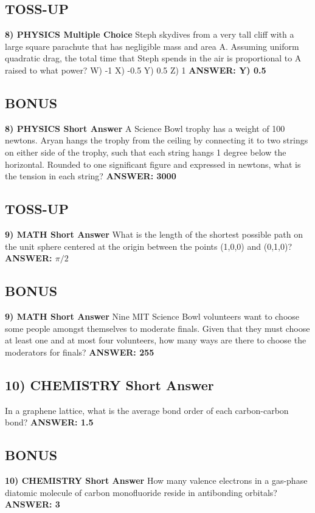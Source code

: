 \documentclass{article}
\begin{document}
\newpage

\subsection*{TOSS-UP}
\textbf{8) PHYSICS Multiple Choice} Steph skydives from a very tall cliff with a large square parachute that has negligible mass and area A. Assuming uniform quadratic drag, the total time that Steph spends in the air is proportional to A raised to what power?
W) -1
X) -0.5
Y) 0.5
Z) 1
\textbf{ANSWER: Y) 0.5}

\subsection*{BONUS}
\textbf{8) PHYSICS Short Answer} A Science Bowl trophy has a weight of 100 newtons. Aryan hangs the trophy from the ceiling by connecting it to two strings on either side of the trophy, such that each string hangs 1 degree below the horizontal. Rounded to one significant figure and expressed in newtons, what is the tension in each string?
\textbf{ANSWER: 3000}

\subsection*{TOSS-UP}
\textbf{9) MATH Short Answer} What is the length of the shortest possible path on the unit sphere centered at the origin between the points (1,0,0) and (0,1,0)?
\textbf{ANSWER: $\pi/2$}

\subsection*{BONUS}
\textbf{9) MATH Short Answer} Nine MIT Science Bowl volunteers want to choose some people amongst themselves to moderate finals. Given that they must choose at least one and at most four volunteers, how many ways are there to choose the moderators for finals?
\textbf{ANSWER: 255}

\newpage

\subsection*{10) CHEMISTRY Short Answer} In a graphene lattice, what is the average bond order of each carbon-carbon bond?
\textbf{ANSWER: 1.5}

\subsection*{BONUS}
\textbf{10) CHEMISTRY Short Answer} How many valence electrons in a gas-phase diatomic molecule of carbon monofluoride reside in antibonding orbitals?
\textbf{ANSWER: 3}
\end{document}

